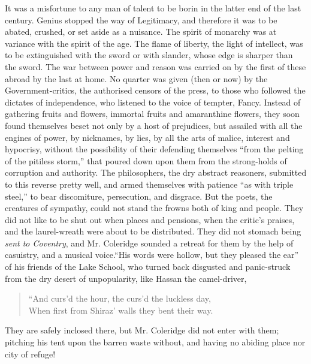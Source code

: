 It was a misfortune to any man of talent to be borin in the latter
end of the last century. Genius stopped the way of Legitimacy, and
therefore it was to be abated, crushed, or set aside as a
nuisance. The spirit of monarchy was at variance with the spirit
of the age. The flame of liberty, the light of intellect, was to
be extinguished with the sword \textemdash or with slander, whose
edge is sharper than the sword. The war between power and reason
was carried on by the first of these abroad \textemdash by the
last at home. No quarter was given (then or now) by the
Government-critics, the authorised censors of the press, to those
who followed the dictates of independence, who listened to the
voice of tempter, Fancy. Instead of gathering fruits and flowers,
immortal fruits and amaranthine flowers, they soon found
themselves beset not only by a host of prejudices, but assailed
with all the engines of power, by nicknames, by lies, by all the
arts of malice, interest and hypocrisy, without the possibility of
their defending themselves ``from the pelting of the pitiless
storm,'' that poured down upon them from the strong-holds of
corruption and authority. The philosophers, the dry abstract
reasoners, submitted to this reverse pretty well, and armed
themselves with patience ``as with triple steel,'' to bear
discomiture, persecution, and disgrace. But the poets, the
creatures of sympathy, could not stand the frowns both of king and
people. They did not like to be shut out when places and pensions,
when the critic's praises, and the laurel-wreath were about to be
distributed. They did not stomach being \emph{sent to Coventry},
and Mr. Coleridge sounded a retreat for them by the help of
casuistry, and a musical voice.\textemdash ``His words were hollow,
but they pleased the ear'' of his friends of the Lake School, who
turned back disgusted and panic-struck from the dry desert of
unpopularity, like Hassan the camel-driver,
\begin{quote}
``And curs'd the hour, the curs'd the luckless day,\\
When first from Shiraz' walls they bent their way.
\end{quote}

They are safely inclosed there, but Mr. Coleridge did not enter
with them; pitching his tent upon the barren waste without, and
having no abiding place nor city of refuge!